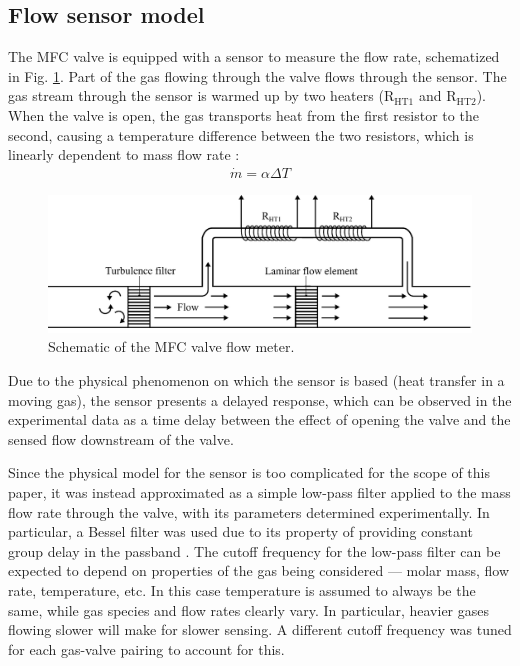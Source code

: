 \documentclass[letterpaper, 10pt, conference]{ieeeconf}
\begin{document}
\subsection{Flow sensor model}
The MFC valve is equipped with a sensor to measure the flow rate, schematized in Fig. \ref{fig:sensor}. Part of the gas flowing through the valve flows through the sensor. The gas stream through the sensor is warmed up by two heaters ($\text{R}_{\text{HT1}}$ and $\text{R}_{\text{HT2}}$). When the valve is open, the gas transports heat from the first resistor to the second, causing a temperature difference between the two resistors, which is linearly dependent to mass flow rate \cite{sensor}:
\begin{align}
    \dot{m} = \alpha \Delta T
\end{align}
\begin{figure}[!htb]
    \centering
    \includegraphics[width = 0.8\columnwidth]{flow_sensor}
    \caption{Schematic of the MFC valve flow meter.}
    \label{fig:sensor}
\end{figure}
Due to the physical phenomenon on which the sensor is based (heat transfer in a moving gas), the sensor presents a delayed response, which can be observed in the experimental data as a time delay between the effect of opening the valve and the sensed flow downstream of the valve. %

Since the physical model for the sensor is too complicated for the scope of this paper, it was instead approximated as a simple low-pass filter applied to the mass flow rate through the valve, with its parameters determined experimentally. In particular, a Bessel filter was used due to its property of providing constant group delay in the passband \cite{filtering}.
The cutoff frequency for the low-pass filter can be expected to depend on properties of the gas being considered --- molar mass, flow rate, temperature, etc. In this case temperature is assumed to always be the same, while gas species and flow rates clearly vary. In particular, heavier gases flowing slower will make for slower sensing. A different cutoff frequency was tuned for each gas-valve pairing to account for this.
\end{document}

